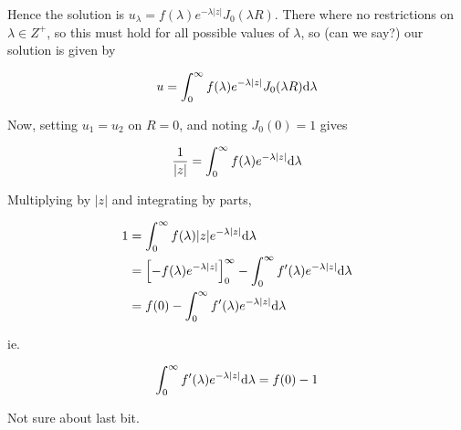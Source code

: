 \documentclass[a4paper]{article}
\begin{document}
Hence the solution is $ u_{\lambda} = f(\lambda) e^{-\lambda | z |} J_{0} (\lambda R) $. There where no restrictions on $ \lambda \in Z^{+} $, so this must hold for all possible values of $ \lambda $, so (can we say?) our solution is given by

\[ u = \int_{0}^{\infty} f(\lambda) e^{-\lambda | z |} J_{0} (\lambda R) \mathrm{d} \lambda  \]

Now, setting $ u_{1} = u_{2} $ on $ R = 0 $, and noting $ J_{0}(0) = 1 $ gives

\[ \frac{1}{| z |} = \int_{0}^{\infty} f(\lambda) e^{-\lambda | z |} \mathrm{d} \lambda \]

Multiplying by $ | z | $ and integrating by parts,

\begin{align*}
1 & = \int_{0}^{\infty} f(\lambda) | z |e^{-\lambda | z |} \mathrm{d} \lambda \\
& = \left[ - f(\lambda) e^{-\lambda | z |}  \right]_{0}^{\infty} - \int_{0}^{\infty} f'(\lambda) e^{-\lambda | z |} \mathrm{d} \lambda \\
& = f(0)  - \int_{0}^{\infty} f'(\lambda) e^{-\lambda | z |} \mathrm{d} \lambda
\end{align*}

ie.

\[  \int_{0}^{\infty} f'(\lambda) e^{-\lambda | z |} \mathrm{d} \lambda = f(0) - 1\]

Not sure about last bit.
\end{document}
